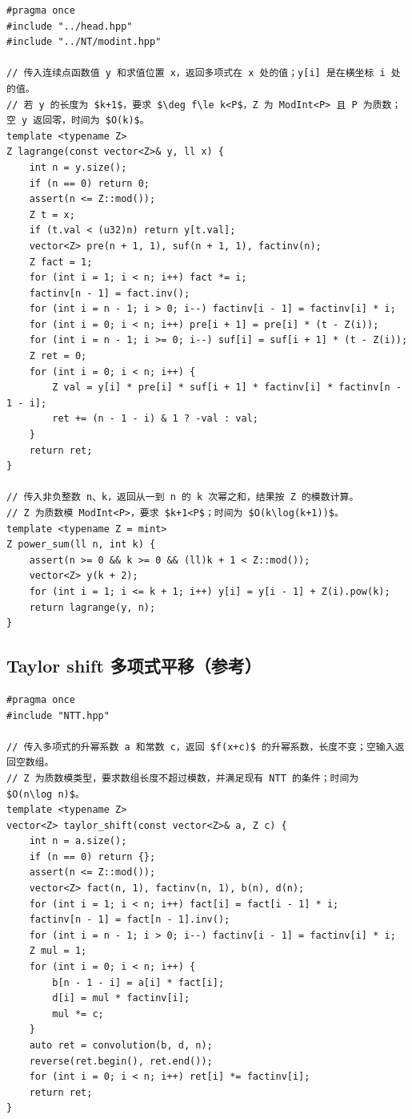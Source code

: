 \begin{lstlisting}
#pragma once
#include "../head.hpp"
#include "../NT/modint.hpp"

// 传入连续点函数值 y 和求值位置 x，返回多项式在 x 处的值；y[i] 是在横坐标 i 处的值。
// 若 y 的长度为 $k+1$，要求 $\deg f\le k<P$，Z 为 ModInt<P> 且 P 为质数；空 y 返回零，时间为 $O(k)$。
template <typename Z>
Z lagrange(const vector<Z>& y, ll x) {
    int n = y.size();
    if (n == 0) return 0;
    assert(n <= Z::mod());
    Z t = x;
    if (t.val < (u32)n) return y[t.val];
    vector<Z> pre(n + 1, 1), suf(n + 1, 1), factinv(n);
    Z fact = 1;
    for (int i = 1; i < n; i++) fact *= i;
    factinv[n - 1] = fact.inv();
    for (int i = n - 1; i > 0; i--) factinv[i - 1] = factinv[i] * i;
    for (int i = 0; i < n; i++) pre[i + 1] = pre[i] * (t - Z(i));
    for (int i = n - 1; i >= 0; i--) suf[i] = suf[i + 1] * (t - Z(i));
    Z ret = 0;
    for (int i = 0; i < n; i++) {
        Z val = y[i] * pre[i] * suf[i + 1] * factinv[i] * factinv[n - 1 - i];
        ret += (n - 1 - i) & 1 ? -val : val;
    }
    return ret;
}

// 传入非负整数 n、k，返回从一到 n 的 k 次幂之和，结果按 Z 的模数计算。
// Z 为质数模 ModInt<P>，要求 $k+1<P$；时间为 $O(k\log(k+1))$。
template <typename Z = mint>
Z power_sum(ll n, int k) {
    assert(n >= 0 && k >= 0 && (ll)k + 1 < Z::mod());
    vector<Z> y(k + 2);
    for (int i = 1; i <= k + 1; i++) y[i] = y[i - 1] + Z(i).pow(k);
    return lagrange(y, n);
}
\end{lstlisting}

\subsection{Taylor shift 多项式平移（参考）}
\par

\begin{lstlisting}
#pragma once
#include "NTT.hpp"

// 传入多项式的升幂系数 a 和常数 c，返回 $f(x+c)$ 的升幂系数，长度不变；空输入返回空数组。
// Z 为质数模类型，要求数组长度不超过模数，并满足现有 NTT 的条件；时间为 $O(n\log n)$。
template <typename Z>
vector<Z> taylor_shift(const vector<Z>& a, Z c) {
    int n = a.size();
    if (n == 0) return {};
    assert(n <= Z::mod());
    vector<Z> fact(n, 1), factinv(n, 1), b(n), d(n);
    for (int i = 1; i < n; i++) fact[i] = fact[i - 1] * i;
    factinv[n - 1] = fact[n - 1].inv();
    for (int i = n - 1; i > 0; i--) factinv[i - 1] = factinv[i] * i;
    Z mul = 1;
    for (int i = 0; i < n; i++) {
        b[n - 1 - i] = a[i] * fact[i];
        d[i] = mul * factinv[i];
        mul *= c;
    }
    auto ret = convolution(b, d, n);
    reverse(ret.begin(), ret.end());
    for (int i = 0; i < n; i++) ret[i] *= factinv[i];
    return ret;
}
\end{lstlisting}

